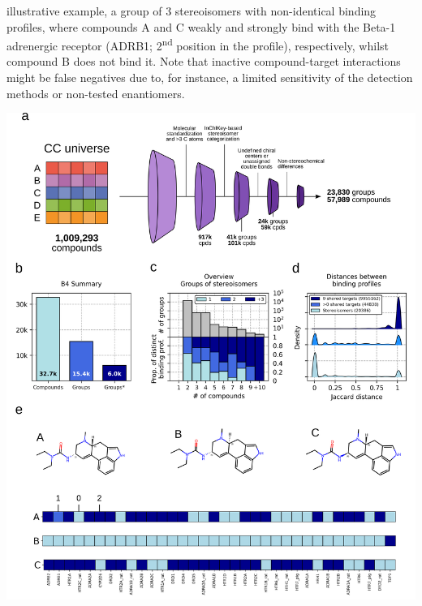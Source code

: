 illustrative example, a group of 3 stereoisomers with non-identical binding profiles, where compounds A and C weakly and strongly bind with the Beta-1 adrenergic receptor (ADRB1; 2\textsuperscript{nd} position in the profile), respectively, whilst compound B does not bind it. Note that inactive compound-target interactions might be false negatives due to, for instance, a limited sensitivity of the detection methods or non-tested enantiomers.


\begin{Figure_modified}
  \centering
  \includegraphics[width=1\linewidth]{figures/Stereoisomers/Main/Fig1_v2.png}
  \caption{
    \textbf{Stereoisomerism and bioactivity.}
    \textbf{a)} Computational pipeline to identify groups of stereoisomers in the CC chemical universe.
    \textbf{b)} Number of unique stereoisomeric compounds with experimentally identified protein targets in the CC B4 space, number of stereoisomer groups, and number of groups with at least 2 compounds with non-identical binding profiles.
    \textbf{c)} Number of groups (y-axis, top) having the specified number of stereoisomers (x-axis). Proportion of these groups (y-axis, bottom) having the specified number of distinct binding profiles (i.e. \textasciitilde60\% of the groups of 2 isomers have a unique binding profile).
}
\end{Figure_modified}
